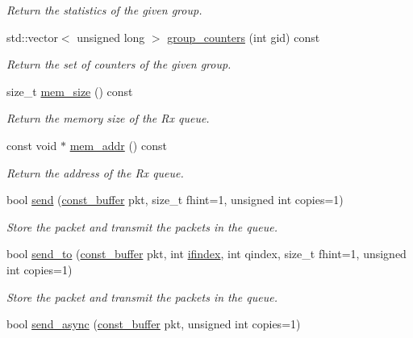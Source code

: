 \begin{DoxyCompactItemize}
\begin{DoxyCompactList}\small\item\em Return the statistics of the given group. \end{DoxyCompactList}\item 
std\+::vector$<$ unsigned long $>$ \hyperlink{classpfq_1_1socket_a5bb4734939ffeb151e199182ec30c4de}{group\+\_\+counters} (int gid) const 
\begin{DoxyCompactList}\small\item\em Return the set of counters of the given group. \end{DoxyCompactList}\item 
size\+\_\+t \hyperlink{classpfq_1_1socket_a1888ae33a42258fdbb2aac1dc3feb55c}{mem\+\_\+size} () const 
\begin{DoxyCompactList}\small\item\em Return the memory size of the Rx queue. \end{DoxyCompactList}\item 
const void $\ast$ \hyperlink{classpfq_1_1socket_a32275b5b77913fadc7671efdef75369b}{mem\+\_\+addr} () const 
\begin{DoxyCompactList}\small\item\em Return the address of the Rx queue. \end{DoxyCompactList}\item 
bool \hyperlink{classpfq_1_1socket_a2d80378cecae811bedc0ae8ff9412e62}{send} (\hyperlink{namespacepfq_ac835a1bd09b4cbaba61c100b50d0a99f}{const\+\_\+buffer} pkt, size\+\_\+t fhint=1, unsigned int copies=1)
\begin{DoxyCompactList}\small\item\em Store the packet and transmit the packets in the queue. \end{DoxyCompactList}\item 
bool \hyperlink{classpfq_1_1socket_a3fddba43aa4da1f30fc04cdc3556054a}{send\+\_\+to} (\hyperlink{namespacepfq_ac835a1bd09b4cbaba61c100b50d0a99f}{const\+\_\+buffer} pkt, int \hyperlink{namespacepfq_a251ac5cc269aa123009754edf62ab8b4}{ifindex}, int qindex, size\+\_\+t fhint=1, unsigned int copies=1)
\begin{DoxyCompactList}\small\item\em Store the packet and transmit the packets in the queue. \end{DoxyCompactList}\item 
bool \hyperlink{classpfq_1_1socket_a16f84967f992ee861e5f18d5e29a3275}{send\+\_\+async} (\hyperlink{namespacepfq_ac835a1bd09b4cbaba61c100b50d0a99f}{const\+\_\+buffer} pkt, unsigned int copies=1)

\end{DoxyCompactItemize}
